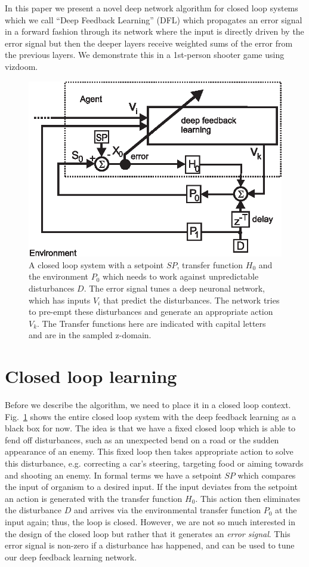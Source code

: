 \documentclass{article}
\begin{document}
In this paper we present a novel deep network algorithm for closed
loop systems which we call ``Deep Feedback Learning'' (DFL) which
propagates an error signal in a forward fashion through its network where
the input is directly driven by the error signal but then the deeper
layers receive weighted sums of the error from the previous layers.
We demonstrate this in a 1st-person shooter game using vizdoom.

\begin{figure}[!ht]
  \centering
  \includegraphics[width=0.75\columnwidth]{closed_loop}
  \caption{A closed loop system with a setpoint $SP$, transfer function $H_0$ and the
    environment $P_0$ which needs to work against unpredictable disturbances $D$.
    The error signal tunes a deep neuronal network, which has inputs
    $V_i$ that predict the disturbances. The network tries to pre-empt these
    disturbances and generate an appropriate action $V_k$. The Transfer
    functions here are indicated with capital letters and are in the
    sampled z-domain.
    \label{closed_loop}}
\end{figure}

\section{Closed loop learning}
Before we describe the algorithm, we need to place it in a closed loop
context. Fig.~\ref{closed_loop} shows the entire closed loop system
with the deep feedback learning as a black box for now. The idea is
that we have a fixed closed loop which is able to fend off
disturbances, such as an unexpected bend on a road or the sudden
appearance of an enemy. This fixed loop then takes appropriate action
to solve this disturbance, e.g. correcting a car's steering, targeting
food or aiming towards and shooting an enemy. In formal terms we have
a setpoint $SP$ which compares the input of organism to a desired
input. If the input deviates from the setpoint an action is generated
with the transfer function $H_0$. This action then eliminates the
disturbance $D$ and arrives via the environmental transfer function
$P_0$ at the input again; thus, the loop is closed. However, we are
not so much interested in the design of the closed loop but rather
that it generates an \textsl{error signal}. This error signal is
non-zero if a disturbance has happened, and can be used to tune our
deep feedback learning network.
\end{document}
